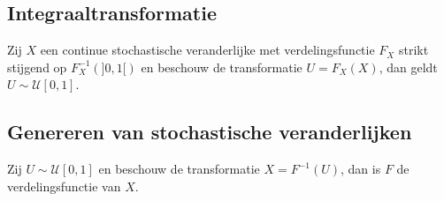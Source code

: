 \documentclass[main.tex]{subfiles}
\begin{document}
\subsection{Integraaltransformatie}
\label{sec:integr}

\begin{ei}
  Zij $X$ een continue stochastische veranderlijke met verdelingsfunctie $F_{X}$ strikt stijgend op $F_{X}^{-1}(]0,1[)$ en beschouw de transformatie $U=F_{X}(X)$, dan geldt $U \sim \mathcal{U}[0,1]$.
\end{ei}

\subsection{Genereren van stochastische veranderlijken}
\label{sec:gener-van-stoch}

\begin{ei}
  Zij $U \sim \mathcal{U}[0,1]$ en beschouw de transformatie $X = F^{-1}(U)$, dan is $F$ de verdelingsfunctie van $X$.
\end{ei}
\end{document}

